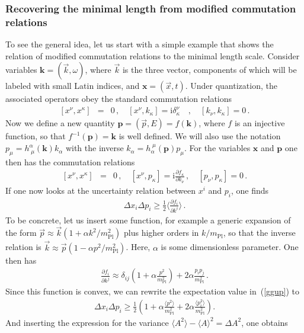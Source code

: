 \documentclass{article}
\def\beqn{\begin{eqnarray}}
\def\eeqn{\end{eqnarray}}
\begin{document}
\subsubsection{Recovering the minimal length from modified commutation relations}
\label{simpleexample}

To see the general idea, let us start with a simple example that shows the relation of modified commutation relations to the minimal length scale. Consider variables $\mathbf{k} = (\vec k, \omega)$, where $\vec k$ is the three vector, components of which will be labeled with small Latin indices, and $\mathbf{x} = (\vec x, t) $. Under quantization, the associated operators obey the standard commutation relations
\beqn
\left[x^\nu,  x^\kappa\right] &=& 0 \,, \quad [ x^\nu, k_\kappa ] = \mathrm{i} \delta^\nu_\kappa \quad , \quad  
\left[k_\nu, k_\kappa\right] = 0  \,. \label{normalcomm}
\eeqn
Now we define a new quantity $\mathbf{p} = (\vec p, E) = f(\mathbf{k}) $, where $f$ is an injective function, so that $f^{-1}(\mathbf{p}) = \mathbf{k}$ is well defined.
We will also use the notation $p_\mu = h^\alpha_{\;\mu}(\mathbf{k}) k_\alpha$ with the inverse $k_\alpha = h_\alpha^{\; \mu}(\mathbf{p}) p_\mu$.  
For the variables $\mathbf{x}$ and $\mathbf{p}$ one then has the commutation relations
\beqn
\left[ x^\nu,  x^\kappa\right] &=& 0 \,, \quad \left[ x^\nu,  p_\kappa\right] = \mathrm{i} \frac{\partial f_\kappa}{\partial k_\nu} 
\,,\quad \left[p_\nu,  p_\kappa\right] = 0 \,. \label{pxother}
\eeqn
If one now looks at the uncertainty relation between $x^i$ and $p_i$, one finds
\beqn
\Delta x_i \Delta p_i \geq \frac{1}{2} \langle \frac{\partial f_i}{\partial k^i} \rangle \,. \label{ggup}
\eeqn
To be concrete, let us insert some function, for example a generic expansion of the form
$\vec p \approx \vec k (1 + \alpha k^2/m_{\mathrm{Pl}}^2)$ plus higher orders in $k/m_{\mathrm{Pl}}$, so that the
inverse relation is $\vec k \approx \vec p ( 1 - \alpha p^2/m_{\mathrm{Pl}}^2 )$. Here, $\alpha$ is some
dimensionless parameter. One then has
\beqn
\frac{\partial f_i}{\partial k^j} \approx \delta_{ij} \left(1 + \alpha \frac{p^2}{m_{\mathrm{Pl}}^2} \right) + 2 \alpha \frac{p_i p_j}{m_{\mathrm{Pl}}^2} \,.
\eeqn
Since this
function is convex, we can rewrite the expectation value in~(\ref{ggup}) to 
  \beqn
\Delta x_i \Delta p_i \geq \frac{1}{2} \left( 1 + \alpha \frac{\langle p^2 \rangle }{m_{\mathrm{Pl}}^2} + 2 
\alpha \frac{\langle p^2_i \rangle }{ m_{\mathrm{Pl}}^2}   \right) .
\eeqn
And inserting the expression for the variance $\langle A^2 \rangle - \langle A \rangle ^2 = \Delta A^2$, one obtains
\end{document}
